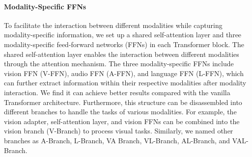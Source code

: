 \paragraph{Modality-Specific FFNs} 
To facilitate the interaction between different modalities while capturing modality-specific information, we set up a shared self-attention layer and three modality-specific feed-forward networks (FFNs) in each Transformer block.
The shared self-attention layer enables the interaction between different modalities through the attention mechanism.
The three modality-specific FFNs include vision FFN (V-FFN), audio FFN (A-FFN), and language FFN (L-FFN), which can further extract information within their respective modalities after modality interaction.
We find it can achieve better results compared with the vanilla Transformer architecture. 
Furthermore, this structure can be disassembled into different branches to handle the tasks of various modalities.
For example, the vision adapter, self-attention layer, and vision FFNs can be combined into the vision branch (V-Branch) to process visual tasks.
Similarly, we named other branches as A-Branch, L-Branch, VA Branch, VL-Branch, AL-Branch, and VAL-Branch.


